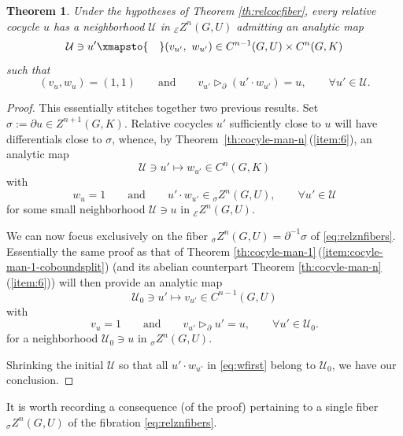 \documentclass[pdftex]{sigma}
\numberwithin{equation}{section}
\newtheorem{Theorem}{Theorem}[section]
\newcommand\cE{{\mathcal E}}
\newcommand\cU{{\mathcal U}}
\begin{document}
\begin{Theorem}\label{th:canconjrel}
 Under the hypotheses of Theorem {\rm \ref{th:relcocfiber}}, every relative cocycle $u$ has a neighborhood $\cU$ in ${}_{\cE}Z^n(G,U)$ admitting an analytic map
 \begin{equation*}
 \cU\ni {u'}
 \xmapsto{\quad}
 (v_{u'},\ w_{u'})\in C^{n-1}(G,U)\times C^n(G,K)
 \end{equation*}
 such that
 \begin{equation*}
 (v_{u},w_{u})=(1,1)
 \qquad\text{and}\qquad
 v_{u'}\triangleright_{\partial} (u'\cdot w_{u'}) = u,\qquad \forall u'\in \cU.
 \end{equation*}
\end{Theorem}
\begin{proof}
 This essentially stitches together two previous results. Set $\sigma:=\partial u\in Z^{n+1}(G,K)$.
 Relative cocycles $u'$ sufficiently close to $u$ will have differentials close to $\sigma$, whence, by Theorem~\ref{th:cocyle-man-n}\,(\ref{item:6}), an analytic map
 \begin{equation*}
 \cU\ni u'\mapsto w_{u'}\in C^n(G,K)
 \end{equation*}
 with
 \begin{equation}\label{eq:wfirst}
 w_{u}=1
 \qquad\text{and}\qquad
 u'\cdot w_{u'} \in {}_{\sigma}Z^n(G,U),\qquad \forall u'\in \cU
 \end{equation}
 for some small neighborhood $\cU\ni u$ in ${}_{\cE}Z^n(G,U)$.

 We can now focus exclusively on the fiber ${}_{\sigma}Z^n(G,U) = \partial^{-1}\sigma$ of \eqref{eq:relznfibers}. Essentially the same proof as that of Theorem \ref{th:cocyle-man-1}\,(\ref{item:cocyle-man-1-coboundsplit}) (and its abelian counterpart Theorem \ref{th:cocyle-man-n}\,(\ref{item:6})) will then provide an analytic map
 \begin{equation*}
 \cU_0\ni u'\mapsto v_{u'}\in C^{n-1}(G,U)
 \end{equation*}
 with
 \begin{equation*}
 v_{u}=1
 \qquad\text{and}\qquad
 v_{u'}\triangleright_{\partial} u' = u,\qquad \forall u'\in \cU_0.
 \end{equation*}
 for a neighborhood $\cU_0\ni u$ in ${}_{\sigma}Z^n(G,U)$.

 Shrinking the initial $\cU$ so that all $u'\cdot w_{u'}$ in \eqref{eq:wfirst} belong to $\cU_0$, we have our conclusion.
\end{proof}

It is worth recording a consequence (of the proof) pertaining to a single fiber ${}_{\sigma}Z^n(G,U)$ of the fibration \eqref{eq:relznfibers}.
\end{document}
